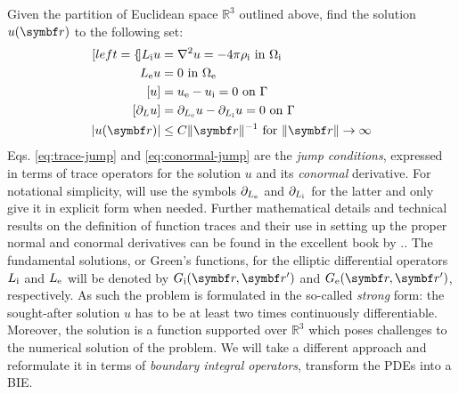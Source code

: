 Given the partition of Euclidean space $\mathbb{R}^3$ outlined above,
find the solution $u(\vect{r})$ to the following set:
\begin{subequations}\label{eq:transmission}
  \begin{align}[left={\empheqlbrace}]
  \Li u &= \nabla^2 u = -4\pi\rhoi \,\, \text{in}\,\, \Omegai \label{eq:internal} \\
  \Le u &= 0 \,\, \text{in}\,\, \Omegae \label{eq:external} \\
  [u] &= \ue - \ui = 0 \,\, \text{on}\,\, \Gamma
  \label{eq:trace-jump} \\
[\partial_L u] &= \partiale u - \partiali u = 0 \,\, \text{on}\,\, \Gamma \label{eq:conormal-jump} \\
|u(\vect{r})| &\leq C \|\vect{r} \|^{-1} \,\,\text{for}\,\,\| \vect{r} \|\rightarrow\infty
\label{eq:radiation}
\end{align}
\end{subequations}
Eqs. \eqref{eq:trace-jump} and \eqref{eq:conormal-jump}
are the \emph{jump conditions}, expressed in terms of trace operators
for the solution $u$ and its \emph{conormal} derivative.
For notational simplicity, will use the symbols $\partial_{L_\mathrm{e}}$ and $\partial_{L_\mathrm{i}}$
for the latter and only give it in explicit form when needed.
Further mathematical details and technical results on the definition of
function traces and their use in setting up the proper normal and
conormal derivatives can be found in the excellent book by
\citeauthor{Sauter2011-an}.\autocite{Sauter2011-an}.
The fundamental solutions, or Green's functions, for the elliptic
differential operators $L_\mathrm{i}$ and $L_\mathrm{e}$ will be denoted by $\Gi$ and
$\Ge$, respectively.
As such the problem is formulated in the so-called \emph{strong} form:
the sought-after solution $u$ has to be at least two times continuously
differentiable.
Moreover, the solution is a function supported over $\mathbb{R}^3$ which
poses challenges to the numerical solution of the problem.
We will take a different approach and reformulate it in terms of
\emph{boundary integral operators}, \ie transform the \acsp{PDE} into a
\gls{BIE}.

